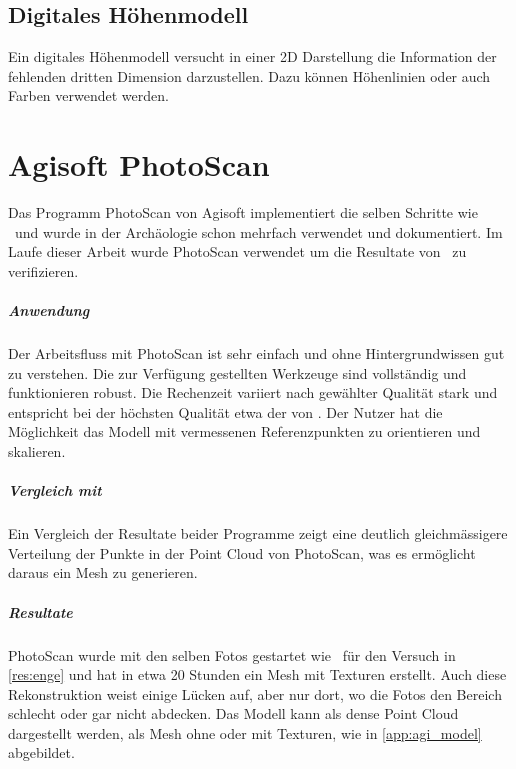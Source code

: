 		\section{Digitales Höhenmodell} \label{app:dtm}
			Ein digitales Höhenmodell versucht in einer 2D Darstellung die Information der fehlenden dritten Dimension darzustellen. Dazu können Höhenlinien oder auch Farben verwendet werden.
			
\chapter{Agisoft PhotoScan}\label{app:photoscan}
	Das Programm PhotoScan von Agisoft implementiert die selben Schritte wie \dronarch\ und wurde in der Archäologie schon mehrfach verwendet und dokumentiert.
	Im Laufe dieser Arbeit wurde PhotoScan verwendet um die Resultate von \dronarch\ zu verifizieren.
	
	\paragraph{Anwendung} Der Arbeitsfluss mit PhotoScan ist sehr einfach und ohne Hintergrundwissen gut zu verstehen. Die zur Verfügung gestellten Werkzeuge sind vollständig und funktionieren robust. Die Rechenzeit variiert nach gewählter Qualität stark und entspricht bei der höchsten Qualität etwa der von \dronarch.
	Der Nutzer hat die Möglichkeit das Modell mit vermessenen Referenzpunkten zu orientieren und skalieren.
	
	\paragraph{Vergleich mit \dronarch}
		Ein Vergleich der Resultate beider Programme zeigt eine deutlich gleichmässigere Verteilung der Punkte in der Point Cloud von PhotoScan, was es ermöglicht daraus ein Mesh zu generieren.
		
	\paragraph{Resultate}
		PhotoScan wurde mit den selben Fotos gestartet wie \dronarch\ für den Versuch in \autoref{res:enge} und hat in etwa 20 Stunden ein Mesh mit Texturen erstellt. Auch diese Rekonstruktion weist einige Lücken auf, aber nur dort, wo die Fotos den Bereich schlecht oder gar nicht abdecken.
		Das Modell kann als dense Point Cloud dargestellt werden, als Mesh ohne oder mit Texturen, wie in \autoref{app:agi_model} abgebildet.
		
